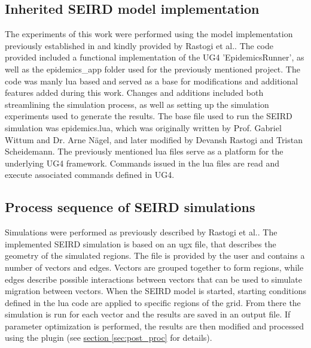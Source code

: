 \subsection{Inherited SEIRD model implementation}
The experiments of this work were  performed using the model implementation previously established in and kindly provided by
Rastogi et al.\cite{Rastogi}. The code provided included a functional implementation of the UG4 'EpidemicsRunner', as well as
the epidemics\_app folder used for  the previously mentioned project. The code was manly lua based and served as a base
for modifications and additional features added during this work. Changes and additions included both streamlining the simulation process, as
well as setting up the simulation experiments used to generate the results. The base file used to run the SEIRD simulation was epidemics.lua,
which was originally written by Prof. Gabriel Wittum and Dr. Arne N\"agel, and later modified by Devansh Rastogi and Tristan Scheidemann.
The previously mentioned lua files serve as a platform for the underlying UG4 framework. Commands issued in the lua files
are read and execute associated commands defined in UG4. 

\subsection{Process sequence of SEIRD simulations}
Simulations were performed as previously described by Rastogi et al.\cite{Rastogi}.
The implemented SEIRD simulation is based on an ugx file, that describes the geometry of the simulated regions. The file is provided
by the user and contains a number of vectors and edges. Vectors are grouped together to form regions, while edges describe possible
interactions between vectors that can be used to simulate migration between vectors. When the SEIRD model is started, starting conditions
defined in the lua code are applied to specific regions of the grid. From there the simulation is run for each
vector and the results are saved in an output file. If parameter optimization is performed, the results are then modified and processed
using the  plugin (see \hyperref[sec:post_proc]{section \ref*{sec:post_proc}} for details).


